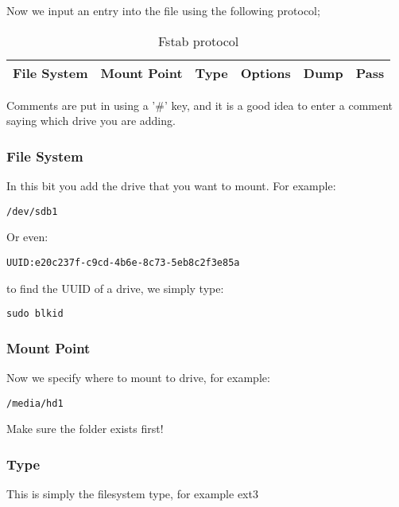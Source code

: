 Now we input an entry into the file using the following protocol;

\begin{table}[!th]
\centering
\begin{tabular}{|c|c|c|c|c|c|}
\hline
\rowcolor{Gray}
File System & Mount Point & Type & Options & Dump & Pass\\
\hline
\end{tabular}
\caption{Fstab protocol}
\label{tab:fstab}
\end{table}

Comments are put in using a '$\#$' key, and it is a good idea to enter a comment saying which drive you are adding.

\subsubsection{File System}

In this bit you add the drive that you want to mount. For example:

\begin{verbatim}
/dev/sdb1
\end{verbatim}

Or even:

\begin{verbatim}
UUID:e20c237f-c9cd-4b6e-8c73-5eb8c2f3e85a
\end{verbatim}

to find the UUID of a drive, we simply type:

\begin{lstlisting}
sudo blkid
\end{lstlisting}

\subsubsection{Mount Point}

Now we specify where to mount to drive, for example:

\begin{verbatim}
/media/hd1
\end{verbatim}

Make sure the folder exists first!

\subsubsection{Type}

This is simply the filesystem type, for example ext3

